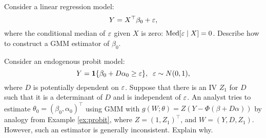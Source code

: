 \documentclass[11pt, A4paper, openany, uplatex]{book}
\begin{document}
\begin{framed}
\begin{exercise}\upshape
	Consider a linear regression model:
	\[
	Y = X^\top \beta_0 + \varepsilon,
	\]
	where the conditional median of $\varepsilon$ given $X$ is zero: $\text{Med}[\varepsilon \mid X] = 0$.
	Describe how to construct a GMM estimator of $\beta_0$. 
\end{exercise}

\begin{exercise}\upshape
	Consider an endogenous probit model:
	\[
		Y = \mathbf{1}\{\beta_0 + D \alpha_0 \ge \varepsilon\}, \;\; \varepsilon \sim N(0,1),
	\]
	where $D$ is potentially dependent on $\varepsilon$.
	Suppose that there is an IV $Z_1$ for $D$ such that it is a determinant of $D$ and is independent of $\varepsilon$. 
	An analyst tries to estimate $\theta_0 = (\beta_0, \alpha_0)^\top$ using GMM with $g(W; \theta) = Z(Y - \Phi(\beta + D \alpha))$ by analogy from Example \ref{ex:probit}, where $Z = (1, Z_1)^\top$, and $W = (Y,D,Z_1)$.
	However, such an estimator is generally inconsistent.
	Explain why.
\end{exercise}
\end{framed}
\end{document}
